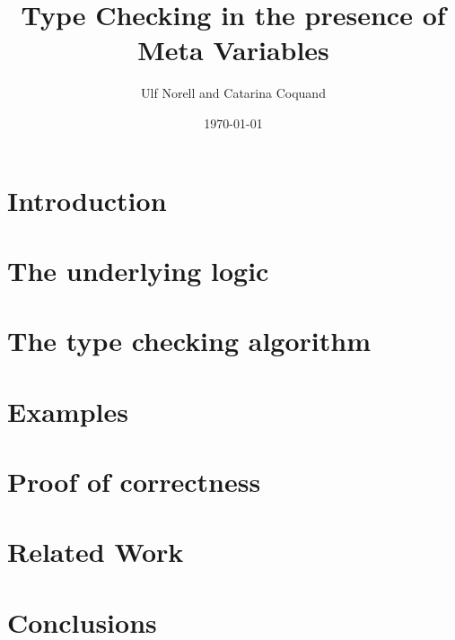 \documentclass[11pt]{llncs}
\title{Type Checking in the presence of Meta Variables}
\author{Ulf Norell and Catarina Coquand}
\institute{Chalmers University of Technology}
\date{\today}
\begin{document}
\maketitle



\section{Introduction} 

\section{The underlying logic \Core} 

\section{The type checking algorithm} \label{secRules} 

\section{Examples} 

\section{Proof of correctness} \label{secProof} 

\section{Related Work} 

\section{Conclusions} 



\end{document}
